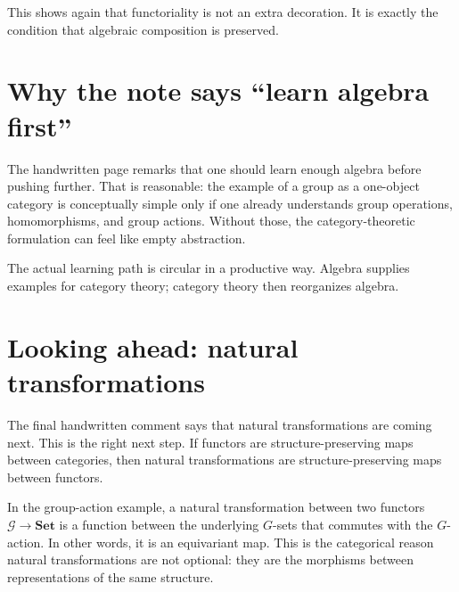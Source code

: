 This shows again that functoriality is not an extra decoration.  It is exactly the condition that algebraic composition is preserved.

\section{Why the note says “learn algebra first”}

The handwritten page remarks that one should learn enough algebra before pushing further.  That is reasonable: the example of a group as a one-object category is conceptually simple only if one already understands group operations, homomorphisms, and group actions.  Without those, the category-theoretic formulation can feel like empty abstraction.

The actual learning path is circular in a productive way.  Algebra supplies examples for category theory; category theory then reorganizes algebra.

\section{Looking ahead: natural transformations}

The final handwritten comment says that natural transformations are coming next.  This is the right next step.  If functors are structure-preserving maps between categories, then natural transformations are structure-preserving maps between functors.

In the group-action example, a natural transformation between two functors $\mathcal G\to\mathbf{Set}$ is a function between the underlying $G$-sets that commutes with the $G$-action.  In other words, it is an equivariant map.  This is the categorical reason natural transformations are not optional: they are the morphisms between representations of the same structure.
